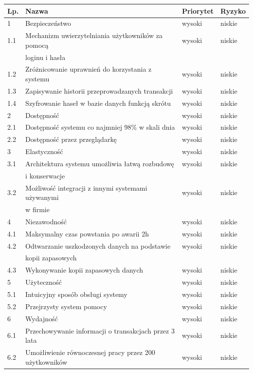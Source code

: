 \begin{table}[h]
	\begin{center}
		\begin{tabular}{| l | l | l | l |}
			\hline
			\textbf{Lp.} & \textbf{Nazwa} & \textbf{Priorytet} & \textbf{Ryzyko} \\
			\hline
			1 & Bezpieczeństwo & wysoki & niskie \\
			1.1 & Mechanizm uwierzytelniania użytkowników za pomocą & wysoki & niskie \\
			& loginu i hasła & & \\
			1.2 & Zróżnicowanie uprawnień do korzystania z systemu & wysoki & niskie \\
			1.3 & Zapisywanie historii przeprowadzanych transakcji & wysoki & niskie \\
			1.4 & Szyfrowanie haseł w bazie danych funkcją skrótu & wysoki & niskie \\
			\hline
			2 & Dostępność & wysoki & niskie \\
			2.1 & Dostępność systemu co najmniej 98\% w skali dnia & wysoki & niskie \\ 
			2.2 & Dostępność przez przeglądarkę & wysoki & niskie \\
			\hline
			3 & Elastyczność & wysoki & niskie \\
			3.1 & Architektura systemu umożliwia łatwą rozbudowę  & wysoki & niskie \\
			& i konserwacje & & \\
			3.2 & Możliwość integracji z innymi systemami używanymi & wysoki & niskie \\
			& w firmie & & \\
			
			\hline
			4 & Niezawodność & wysoki & niskie \\
			4.1 & Maksymalny czas powstania po awarii 2h & wysoki & niskie \\
			4.2 & Odtwarzanie uszkodzonych danych na podstawie & wysoki	& niskie \\
			& kopii zapasowych & & \\
			4.3 & Wykonywanie kopii zapasowych danych & wysoki & niskie \\
			\hline
			5 & Użyteczność & wysoki & niskie \\
			5.1 & Intuicyjny sposób obsługi systemy & wysoki & niskie \\
			5.2 & Przejrzysty system pomocy & wysoki & niskie \\
			\hline
			6 & Wydajność & wysoki & niskie \\
			6.1 & Przechowywanie informacji o transakcjach przez 3 lata & wysoki & niskie
			\\
			6.2 & Umożliwienie równoczesnej pracy przez 200 użytkowników & wysoki &
			niskie
			\\
			\hline
		\end{tabular}
	\end{center}
\end{table}
\FloatBarrier
